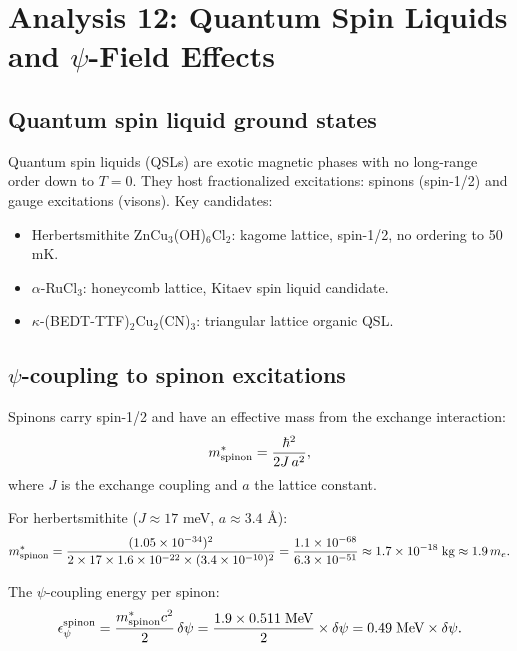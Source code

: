 \documentclass[11pt]{article}
\newcommand{\ee}[1]{\times 10^{#1}}
\begin{document}
\section{Analysis 12: Quantum Spin Liquids and $\psi$-Field Effects}
\label{sec:qsl}

\subsection{Quantum spin liquid ground states}

Quantum spin liquids (QSLs) are exotic magnetic phases with no long-range order down to $T = 0$. They host fractionalized excitations: spinons (spin-1/2) and gauge excitations (visons). Key candidates:
\begin{itemize}
\item Herbertsmithite ZnCu$_3$(OH)$_6$Cl$_2$: kagome lattice, spin-1/2, no ordering to 50 mK.
\item $\alpha$-RuCl$_3$: honeycomb lattice, Kitaev spin liquid candidate.
\item $\kappa$-(BEDT-TTF)$_2$Cu$_2$(CN)$_3$: triangular lattice organic QSL.
\end{itemize}

\subsection{$\psi$-coupling to spinon excitations}

Spinons carry spin-1/2 and have an effective mass from the exchange interaction:
\begin{equation}
m_{\rm spinon}^* = \frac{\hbar^2}{2J\,a^2},
\end{equation}
where $J$ is the exchange coupling and $a$ the lattice constant.

For herbertsmithite ($J \approx 17$ meV, $a \approx 3.4$ \AA):
\begin{equation}
m_{\rm spinon}^* = \frac{(1.05\ee{-34})^2}{2\times 17\times 1.6\ee{-22}\times (3.4\ee{-10})^2} = \frac{1.1\ee{-68}}{6.3\ee{-51}} \approx 1.7\ee{-18}\;\text{kg} \approx 1.9\,m_e.
\end{equation}

The $\psi$-coupling energy per spinon:
\begin{equation}
\epsilon_\psi^{\rm spinon} = \frac{m_{\rm spinon}^* c^2}{2}\,\delta\psi = \frac{1.9\times 0.511\;\text{MeV}}{2}\times\delta\psi = 0.49\;\text{MeV}\times\delta\psi.
\end{equation}
\end{document}
